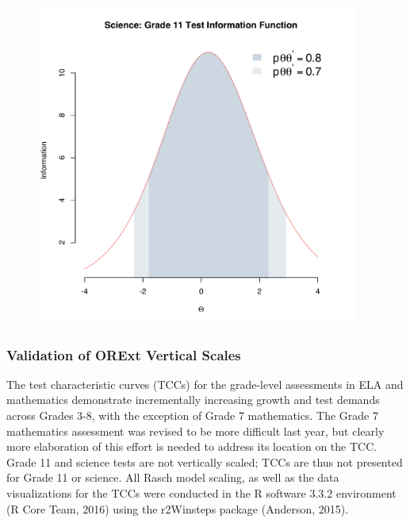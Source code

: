 \documentclass[]{article}
\begin{document}
\begin{figure}
\centering
\includegraphics[height=4.16667in]{tifs/science11tif.pdf}
\caption{}
\end{figure}

\subsubsection{Validation of ORExt Vertical
Scales}\label{validation-of-orext-vertical-scales}

The test characteristic curves (TCCs) for the grade-level assessments in
ELA and mathematics demonstrate incrementally increasing growth and test
demands across Grades 3-8, with the exception of Grade 7 mathematics.
The Grade 7 mathematics assessment was revised to be more difficult last
year, but clearly more elaboration of this effort is needed to address
its location on the TCC. Grade 11 and science tests are not vertically
scaled; TCCs are thus not presented for Grade 11 or science. All Rasch
model scaling, as well as the data visualizations for the TCCs were
conducted in the R software 3.3.2 environment (R Core Team, 2016) using
the r2Winsteps package (Anderson, 2015).
\end{document}
